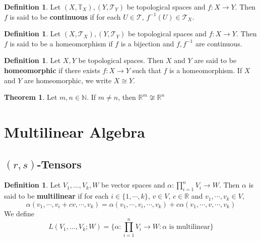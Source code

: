 \documentclass[12pt]{amsart}
\theoremstyle{definition}
\newtheorem{defn}[definition]{Definition}
\newtheorem{thm}[definition]{Theorem}
\newcommand{\al}{\alpha}
\newcommand{\N}{\mathbb{N}}
\newcommand{\R}{\mathbb{R}}
\newcommand{\T}{\mathbb{T}}
\newcommand{\MT}{\mathcal{T}}
\begin{document}
\begin{defn}
Let $(X, \T_X), (Y, \MT_Y)$ be topological spaces and $f:X\rightarrow Y$. Then $f$ is said to be \textbf{continuous} if for each $U \in \MT$, $f^{-1}(U) \in \MT_X$.
\end{defn}

\begin{defn}
Let $(X, \MT_X), (Y, \MT_Y)$ be topological spaces and $f:X\rightarrow Y$. Then $f$ is said to be a homeomorphism if $f$ is a bijection and $f, f^{-1}$ are continuous. 
\end{defn}

\begin{defn}
Let $X, Y$ be topological spaces. Then $X$ and $Y$ are said to be \textbf{homeomorphic} if there exists $f:X \rightarrow Y$ such that $f$ is a homeomorphism. If $X$ and $Y$ are homeomorphic, we write $X \cong Y$. 
\end{defn}

\begin{thm}
Let $m,n \in \N$. If $m \neq n$, then $\R^m \not \cong \R^n$
\end{thm}






















\newpage
	\section{Multilinear Algebra}
	
	\subsection{$(r,s)$-Tensors}
	
	\begin{defn}
	Let $V_1, \dots, V_k, W$ be vector spaces and $\al : \prod_{i=1}^n V_i \rightarrow W$. Then $\al$ is said to be \textbf{multilinear} if for each $i \in \{1, \cdots, k\}$, $v \in V$, $c \in \R$ and $v_1, \cdots, v_k \in V$, $$\al(v_1, \cdots, v_i + cv, \cdots, v_k) = \al(v_1, \cdots, v_i, \cdots, v_k) + c\al(v_1, \cdots, v, \cdots, v_k)$$
	We define $$L(V_1, \dots, V_k; W) = \bigg \{\al : \prod_{i=1}^n V_i \rightarrow W: \al \text{ is multilinear} \bigg\}$$ 
	\end{defn}	
	
\end{document}
